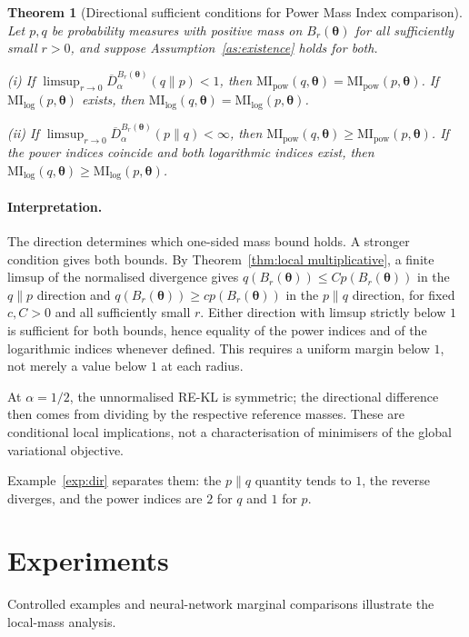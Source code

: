 \documentclass[11pt,a4paper]{article}
\newcommand{\MI}{\mathrm{MI}}
\newcommand{\pa}{\boldsymbol\theta}
\theoremstyle{compactplain}
\newtheorem{theorem}{Theorem}[section]
\theoremstyle{compactdefinition}
\numberwithin{equation}{section}
\begin{document}
\begin{theorem}[Directional sufficient conditions for Power Mass Index comparison]\label{thm:one-sided-MI-pow}
Let \(p,q\) be probability measures with positive mass on \(B_r(\pa)\) for all sufficiently small \(r>0\), and suppose Assumption~\ref{as:existence} holds for both.

\textnormal{(i)} If \(\limsup_{r\to0}\overline D_\alpha^{B_r(\pa)}(q\|p)<1\), then \(\MI_{\mathrm{pow}}(q,\pa)=\MI_{\mathrm{pow}}(p,\pa)\). If \(\MI_{\mathrm{log}}(p,\pa)\) exists, then \(\MI_{\mathrm{log}}(q,\pa)=\MI_{\mathrm{log}}(p,\pa)\).

\textnormal{(ii)} If \(\limsup_{r\to0}\overline D_\alpha^{B_r(\pa)}(p\|q)<\infty\), then \(\MI_{\mathrm{pow}}(q,\pa)\ge\MI_{\mathrm{pow}}(p,\pa)\). If the power indices coincide and both logarithmic indices exist, then \(\MI_{\mathrm{log}}(q,\pa)\ge\MI_{\mathrm{log}}(p,\pa)\).
\end{theorem}

\paragraph{Interpretation.}
The direction determines which one-sided mass bound holds. A stronger condition gives both bounds.
By Theorem~\ref{thm:local multiplicative}, a finite limsup of the normalised divergence gives
\(q(B_r(\pa))\le C p(B_r(\pa))\) in the \(q\|p\) direction and
\(q(B_r(\pa))\ge c p(B_r(\pa))\) in the \(p\|q\) direction,
for fixed \(c,C>0\) and all sufficiently small \(r\). Either direction with limsup strictly below \(1\) is sufficient
for both bounds, hence equality of the power indices and of the logarithmic
indices whenever defined. This requires a uniform margin below \(1\), not
merely a value below \(1\) at each radius.

At \(\alpha=1/2\), the unnormalised RE-KL is symmetric; the directional
difference then comes from dividing by the respective reference masses.
These are conditional local implications, not a characterisation of
minimisers of the global variational objective.

Example~\ref{exp:dir} separates them: the \(p\|q\) quantity tends to \(1\), the reverse diverges, and the power indices are \(2\) for \(q\) and \(1\) for \(p\).
\section{Experiments}\label{sec:experiments}

Controlled examples and neural-network marginal comparisons illustrate the local-mass analysis.
\end{document}
